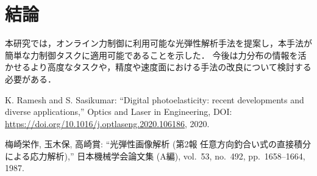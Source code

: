 \documentclass[a4paper,papersize,dvipdfmx]{mtabst}
\begin{document}

\section{結論}
本研究では，オンライン力制御に利用可能な光弾性解析手法を提案し，本手法が簡単な力制御タスクに適用可能であることを示した．
今後は力分布の情報を活かせるより高度なタスクや，精度や速度面における手法の改良について検討する必要がある．

\begin{thebibliography}{9}
  K. Ramesh and S. Sasikumar:
  ``Digital photoelasticity: recent developments and diverse applications,''
  Optics and Laser in Engineering, DOI: \url{https://doi.org/10.1016/j.optlaseng.2020.106186}, 2020.

  梅崎栄作, 玉木保, 高崎賞:
  ``光弾性画像解析 (第2報 任意方向釣合い式の直接積分による応力解析),''
  日本機械学会論文集 (A編), vol.~53, no.~492, pp.~1658--1664, 1987.
\end{thebibliography}
\end{document}
